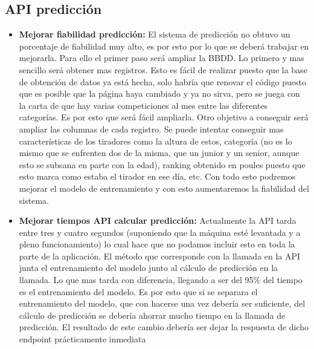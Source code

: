 \subsection{API predicción}
\begin{itemize}
  \item \textbf{Mejorar fiabilidad predicción:} El sistema de predicción no obtuvo un
    porcentaje de fiabilidad muy alto, es por esto por lo que se deberá trabajar
    en mejorarla. Para ello el primer paso será ampliar la \acs{BBDD}. Lo primero y mas sencillo
    será obtener mas registros. Esto es fácil de realizar puesto que la base de obtención
    de datos ya está hecha, solo habría que renovar el código puesto que es posible
    que la página haya cambiado y ya no sirva, pero se juega con la carta de que
    hay varias competiciones al mes entre las diferentes categorías. Es por esto
    que será fácil ampliarla. Otro objetivo a conseguir será ampliar las columnas
    de cada registro. Se puede intentar conseguir mas características de los tiradores
    como la altura de estos, categoría (no es lo mismo que se enfrenten dos de la misma,
    que un junior y un senior, aunque esto se subsana en parte con la edad), ranking
    obtenido en poules puesto que esto marca como estaba el tirador en ese día, etc.
    Con todo esto podremos mejorar el modelo de entrenamiento y con esto aumentaremos
    la fiabilidad del sistema.

  \item \textbf{Mejorar tiempos API calcular predicción:} Actualmente la API tarda entre
    tres y cuatro segundos (suponiendo que la máquina esté levantada y a pleno funcionamiento)
    lo cual hace que no podamos incluir esto en toda la parte de la aplicación. El método
    que corresponde con la llamada en la API junta el entrenamiento del modelo junto
    al cálculo de predicción en la llamada. Lo que mas tarda con diferencia, llegando a ser
    del 95\% del tiempo es el entrenamiento del modelo. Es por esto que si se separara
    el entrenamiento del modelo, que con hacerse una vez debería ser suficiente, del
    cálculo de predicción se debería ahorrar mucho tiempo en la llamada de predicción.
    El resultado de este cambio debería ser dejar la respuesta de dicho endpoint prácticamente
    inmediata
\end{itemize}

